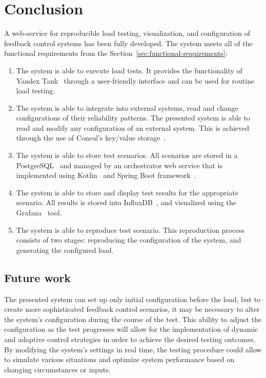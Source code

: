 \chapter{Conclusion}
\label{ch:conclustion}

A web-service for reproducible load testing, visualization, and configuration of feedback control systems has been fully developed. The system meets all of the functional requirements from the Section~\ref{sec:functional-requirements}:
\begin{enumerate}
    \item The system is able to execute load tests. It provides the functionality of Yandex Tank~\cite{yandex_tank} through a user-friendly interface and can be used for routine load testing.
    \item The system is able to integrate into external systems, read and change configurations of their reliability patterns. The presented system is able to read and modify any configuration of an external system. This is achieved through the use of Consul's key/value storage~\cite{consul}.
    \item The system is able to store test scenarios. All scenarios are stored in a PostgreSQL~\cite{postgresql} and managed by an orchestrator web service that is implemented using Kotlin~\cite{kotlin} and Spring Boot framework~\cite{spring}.
    \item The system is able to store and display test results for the appropriate scenario. All results is stored into InfluxDB~\cite{influxdb}, and visualized using the Grafana~\cite{grafana} tool.
    \item The system is able to reproduce test scenario. This reproduction process consists of two stages: reproducing the configuration of the system, and generating the configured load.
\end{enumerate}

\section{Future work}\label{sec:future}
The presented system can set up only initial configuration before the load, but to create more sophisticated feedback control scenarios, it may be necessary to alter the system's configuration during the course of the test.
This ability to adjust the configuration as the test progresses will allow for the implementation of dynamic and adaptive control strategies in order to achieve the desired testing outcomes.
By modifying the system's settings in real time, the testing procedure could allow to simulate various situations and optimize system performance based on changing circumstances or inputs.